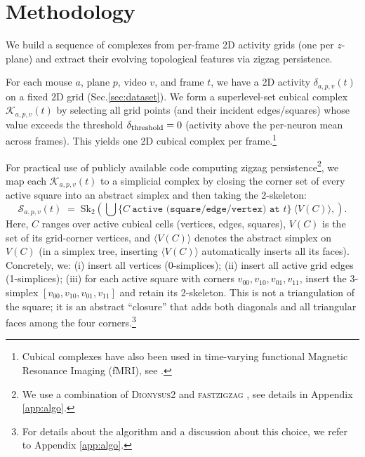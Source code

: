 \documentclass[11pt]{article}
\begin{document}
\section{Methodology}\label{sec:method}

We build a sequence of complexes from per-frame 2D activity grids (one per $z$-plane) and extract their evolving topological features via zigzag persistence. 

For each mouse $a$, plane $p$, video $v$, and frame $t$, we have a 2D activity $\delta_{a,p,v}(t)$ on a fixed 2D grid (Sec.\ref{sec:dataset}).
We form a superlevel-set cubical complex $\mathcal{K}_{a,p,v}(t)$ by selecting all grid points (and their incident edges/squares) whose value exceeds the threshold $\delta_{{\rm threshold}}=0$ (activity above the per-neuron mean across frames). This yields one 2D cubical complex per frame.\footnote{Cubical complexes have also been used in time-varying functional Magnetic Resonance Imaging (fMRI), see \cite{rieckcubical}. }

For practical use of publicly available code computing zigzag persistence\footnote{We use a combination of \textsc{Dionysus2} \cite{dionysus} and \textsc{fastzigzag} \cite{dey2022fastcomputationzigzagpersistence}, see details in Appendix \ref{app:algo}.}, we map each $\mathcal{K}_{a,p,v}(t)$ to a simplicial complex by closing the corner set of every active square into an abstract simplex and then taking the 2-skeleton:
\begin{equation}
\mathcal{S}_{a,p,v}(t)\;=\;\mathrm{Sk}_2\!\left(\bigcup\{C\ \texttt{active (square/edge/vertex) at } t\}\ \langle V(C)\rangle,\right).
\end{equation}
Here, $C$ ranges over active cubical cells (vertices, edges, squares), $V(C)$ is the set of its grid-corner vertices, and $\langle V(C)\rangle$ denotes the abstract simplex on $V(C)$ (in a simplex tree, inserting $\langle V(C)\rangle$ automatically inserts all its faces). Concretely, we:
(i) insert all vertices (0-simplices);
(ii) insert all active grid edges (1-simplices);
(iii) for each active square with corners ${v_{00},v_{10},v_{01},v_{11}}$, insert the 3-simplex $[v_{00},v_{10},v_{01},v_{11}]$ and retain its 2-skeleton.
This is not a triangulation of the square; it is an abstract “closure” that adds both diagonals and all triangular faces among the four corners.\footnote{For details about the algorithm and a discussion about this choice, we refer to Appendix \ref{app:algo}.}
\end{document}
